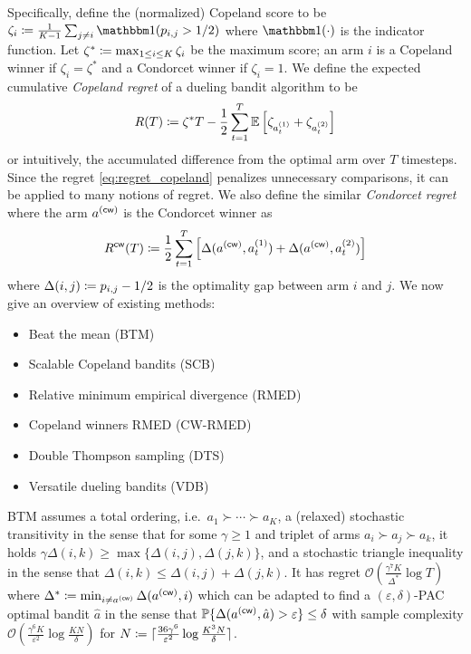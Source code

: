 \documentclass[10pt,twocolumn,letterpaper]{article}
\begin{document}
Specifically, define the (normalized) Copeland score to be
\( \zeta_i \defeq \frac{1}{K - 1} \sum_{j \neq i} \Ind(p_{i, j} > 1/2)
\) where \( \Ind(\cdot) \) is the indicator function.
Let \( \zeta^* \coloneqq \max_{1 \leq i \leq K} \zeta_i \) be the
maximum score; an arm \( i \) is a Copeland winner if \( \zeta_i
= \zeta^* \) and a Condorcet winner if \( \zeta_i = 1 \).
We define the expected cumulative \emph{Copeland
regret} of a dueling bandit algorithm to be
\begin{align}
  \label{eq:regret_copeland}
  R(T) \coloneqq
    \zeta^* T - \frac{1}{2} \sum_{t = 1}^T \operatorname{\mathbb{E}} \left [
      \zeta_{a_t^{(1)}} + \zeta_{a_t^{(2)}}
    \right ]
\end{align}
or intuitively, the accumulated difference
from the optimal arm over \( T \) timesteps.
Since the regret \eqref{eq:regret_copeland} penalizes unnecessary
comparisons, it can be applied to many notions of regret.
We also define the similar \emph{Condorcet regret} \cite{saha2022versatile}
where the arm \( a^{(\operatorname{\mathsf{cw}})} \) is the Condorcet winner as
\begin{align}
  \label{eq:regret_condorcet}
  R^{\operatorname{\mathsf{cw}}}(T) \coloneqq
    \frac{1}{2} \sum_{t = 1}^T \left [
      \Delta(a^{(\operatorname{\mathsf{cw}})}, a_t^{(1)})
      + \Delta(a^{(\operatorname{\mathsf{cw}})}, a_t^{(2)})
    \right ]
\end{align}
where \( \Delta(i, j) \coloneqq p_{i, j} - 1/2 \) is
the optimality gap between arm \( i \) and \( j \).
We now give an overview of existing methods:
\begin{itemize}
  \item Beat the mean (BTM) \cite{yue2011beat}
  \item Scalable Copeland bandits (SCB) \cite{zoghi2015copeland}
  \item Relative minimum empirical divergence (RMED) \cite{komiyama2015regret}
  \item Copeland winners RMED (CW-RMED) \cite{komiyama2016copeland}
  \item Double Thompson sampling (DTS) \cite{wu2016double}
  \item Versatile dueling bandits (VDB) \cite{saha2022versatile}
\end{itemize}

BTM assumes a total ordering, i.e.\ \( a_1 \succ \dotsb \succ a_K \), a
(relaxed) stochastic transitivity in the sense that for some \( \gamma
\geq 1 \) and triplet of arms \( a_i \succ a_j \succ a_k \), it holds \(
\gamma \Delta(i, k) \geq \max \{ \Delta(i, j), \Delta(j, k) \} \), and
a stochastic triangle inequality in the sense that \( \Delta(i, k) \leq
\Delta(i, j) + \Delta(j, k) \).
It has regret \( \mathcal{O}(\frac{\gamma^7 K}{\Delta^*} \log T) \) where \(
\Delta^* \coloneqq \min_{i \neq a^{(\operatorname{\mathsf{cw}})}} \Delta(a^{(\operatorname{\mathsf{cw}})}, i) \) which can be
adapted to find a \( (\varepsilon, \delta) \)-PAC optimal bandit \( \hat{a}
\) in the sense that \( \operatorname{\mathbb{P}}\{ \Delta(a^{(\operatorname{\mathsf{cw}})}, \hat{a}) > \varepsilon
\} \leq \delta \) with sample complexity \( \mathcal{O}(\frac{\gamma^6
K}{\varepsilon^2} \log \frac{K N}{\delta} ) \) for \( N \coloneqq \lceil\frac{36
\gamma^6}{\varepsilon^2} \log \frac{K^3 N}{\delta}\rceil \).
\end{document}
